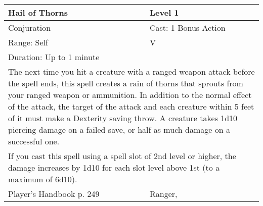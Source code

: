 \documentclass[11pt]{report}
\begin{document}
\begin{table}[H]
	\begin{tabular}{||p{6cm}|p{6cm}||}
		\hline\hline
		\bf{Hail of Thorns} & Level 1\\ \hline
		Conjuration & Cast: 1 Bonus Action\\ \hline
		Range: Self & V\\ \hline
		Duration: Up to 1 minute & \\ \hline
		\multicolumn{2}{||p{12cm}||}{The next time you hit a creature with a ranged weapon attack before the spell ends, this spell creates a rain of thorns that sprouts from your ranged weapon or ammunition. In addition to the normal effect of the attack, the target of the attack and each creature within 5 feet of it must make a Dexterity saving throw. A creature takes 1d10 piercing damage on a failed save, or half as much damage on a successful one.}\\ \hline
		\multicolumn{2}{||p{12cm}||}{If you cast this spell using a spell slot of 2nd level or higher, the damage increases by 1d10 for each slot level above 1st (to a maximum of 6d10).}\\ \hline
Player's Handbook p. 249 & Ranger, \\ \hline\hline
	\end{tabular}
\end{table}
\end{document}
